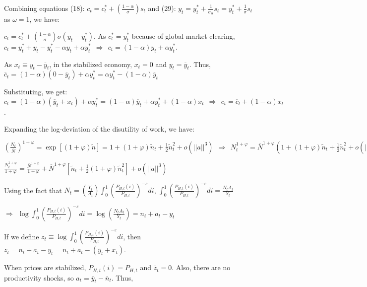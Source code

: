 \documentclass[
]{article}
\begin{document}
Combining equations (18):
\(\displaystyle c_t=c_t^*+ \left(\frac{1-\alpha}{\sigma} \right) s_t\)
and (29):
\(\displaystyle y_t = y_t^*+\frac{1}{\sigma_\alpha}s_t = y_t^*+\frac{1}{\sigma}s_t\)
as \(\omega=1\), we have:

\(\displaystyle c_t=c_t^*+\left( \frac{1-\alpha}{\sigma} \right)\sigma(y_t-y_t^*)\).
As \(c_t^*=y_t^*\) because of global market clearing,
\(c_t=y_t^* + y_t -y_t^* -\alpha y_t + \alpha y_t^* \ \ \Rightarrow \ \ c_t = (1-\alpha)y_t+\alpha y_t^*\).

As \(x_t \equiv y_t-\overline{y}_t\), in the stabilized economy,
\(x_t=0\) and \(y_t=\overline{y}_t\). Thus,
\(\overline{c}_t = (1-\alpha)(0-\overline{y}_t)+\alpha y_t^*=\alpha y_t^*-(1-\alpha)\overline {y}_t\)

Substituting, we get:
\(c_t = (1-\alpha)(\overline{y}_t+x_t)+\alpha y_t^*=(1-\alpha)\overline{y}_t+\alpha y_t^* +(1-\alpha)x_t \ \ \Rightarrow \ \ c_t=\overline{c}_t+(1-\alpha)x_t\).

Expanding the log-deviation of the disutility of work, we have:

\(\displaystyle \left( \frac{N_t}{\overline{N} } \right)^{1+\varphi}=\exp[(1+\varphi)\widetilde{n}]=1+(1+\varphi)\widetilde{n}_t + \frac{1}{2}\widetilde{n}_t^2 + o(||a||^3) \ \ \Rightarrow \ \ N_t^{1+\varphi} = \overline{N}^{1+\varphi} \left( 1+(1+\varphi)\widetilde{n}_t + \frac{1}{2}\widetilde{n}_t^2 + o(||b||^3) \right)\)

\(\displaystyle \frac{N_t^{1+\varphi}}{1+\varphi} = \frac{\overline{N}^{1+\varphi}}{1+\varphi} +\overline{N}^{1+\varphi}\left[ \widetilde{n}_t + \frac{1}{2}(1+\varphi)\widetilde{n}_t^2 \right] + o(||a||^3)\)

Using the fact that
\(\displaystyle N_t=\left(\frac{Y_t}{A_t} \right) \int_0^1 \left(\frac{P_{H,t}(i)}{P_{H,t}} \right)^{-\varepsilon}di\),
\(\displaystyle \int_0^1 \left(\frac{P_{H,t}(i)}{P_{H,t}} \right)^{-\varepsilon}di=\frac{N_t A_t}{Y_t}\)

\(\displaystyle \Rightarrow \ \ \log \int_0^1 \left(\frac{P_{H,t}(i)}{P_{H,t}} \right)^{-\varepsilon}di= \log \left( \frac{N_t A_t}{Y_t} \right)=n_t+a_t-y_t\)

If we define
\(\displaystyle z_t \equiv \log \int_0^1 \left(\frac{P_{H,t}(i)}{P_{H,t}} \right)^{-\varepsilon}di\),
then \(z_t=n_t+a_t-y_t=n_t+a_t-(\overline{y}_t+x_t)\).

When prices are stabilized, \(P_{H,t}(i)=P_{H,t}\) and
\(\overline{z}_t=0\). Also, there are no productivity shocks, so
\(a_t= \overline{y}_t-\overline{n}_t\). Thus,
\end{document}
